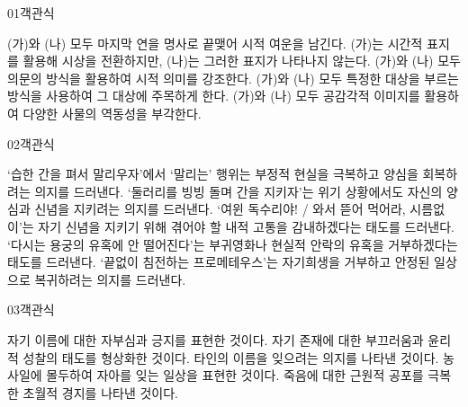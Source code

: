 \documentclass[fs85,seriesWit]{korfarm-base}
\begin{document}
\kfBeginMC
\begin{kfQBlock}{01}{객관식}
\begin{kfChoices}
\kfChoice (가)와 (나) 모두 마지막 연을 명사로 끝맺어 시적 여운을 남긴다.
\kfChoice (가)는 시간적 표지를 활용해 시상을 전환하지만, (나)는 그러한 표지가 나타나지 않는다.
\kfChoice (가)와 (나) 모두 의문의 방식을 활용하여 시적 의미를 강조한다.
\kfChoice (가)와 (나) 모두 특정한 대상을 부르는 방식을 사용하여 그 대상에 주목하게 한다.
\kfChoice (가)와 (나) 모두 공감각적 이미지를 활용하여 다양한 사물의 역동성을 부각한다.
\end{kfChoices}
\end{kfQBlock}

\begin{kfQBlock}{02}{객관식}
\begin{kfChoices}
\kfChoice ‘습한 간을 펴서 말리우자’에서 ‘말리는’ 행위는 부정적 현실을 극복하고 양심을 회복하려는 의지를 드러낸다.
\kfChoice ‘둘러리를 빙빙 돌며 간을 지키자’는 위기 상황에서도 자신의 양심과 신념을 지키려는 의지를 드러낸다.
\kfChoice ‘여윈 독수리야! / 와서 뜯어 먹어라, 시름없이’는 자기 신념을 지키기 위해 겪어야 할 내적 고통을 감내하겠다는 태도를 드러낸다.
\kfChoice ‘다시는 용궁의 유혹에 안 떨어진다’는 부귀영화나 현실적 안락의 유혹을 거부하겠다는 태도를 드러낸다.
\kfChoice ‘끝없이 침전하는 프로메테우스’는 자기희생을 거부하고 안정된 일상으로 복귀하려는 의지를 드러낸다.
\end{kfChoices}
\end{kfQBlock}

\begin{kfQBlock}{03}{객관식}
\begin{kfChoices}
\kfChoice 자기 이름에 대한 자부심과 긍지를 표현한 것이다.
\kfChoice 자기 존재에 대한 부끄러움과 윤리적 성찰의 태도를 형상화한 것이다.
\kfChoice 타인의 이름을 잊으려는 의지를 나타낸 것이다.
\kfChoice 농사일에 몰두하여 자아를 잊는 일상을 표현한 것이다.
\kfChoice 죽음에 대한 근원적 공포를 극복한 초월적 경지를 나타낸 것이다.
\end{kfChoices}
\end{kfQBlock}
\end{document}
